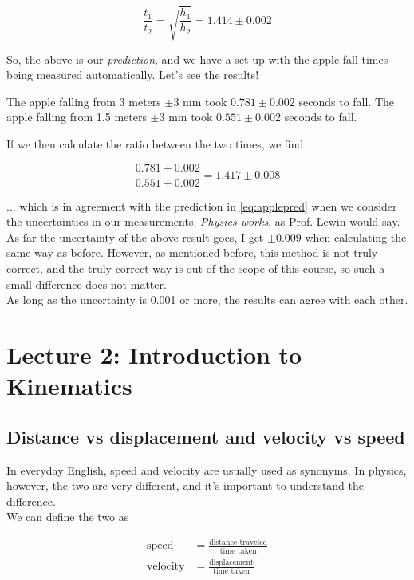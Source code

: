\documentclass[8.01x]{subfiles}
\begin{document}
\begin{equation}
 \frac{t_1}{t_2} = \sqrt{\frac{h_1}{h_2}} = 1.414 \pm 0.002 \label{eq:applepred}
\end{equation}

So, the above is our \emph{prediction}, and we have a set-up with the apple fall times being measured automatically. Let's see the results!

The apple falling from 3 meters $\pm 3$ mm took $0.781 \pm 0.002$ seconds to fall. The apple falling from 1.5 meters $\pm 3$ mm took $0.551 \pm 0.002$ seconds to fall.

If we then calculate the ratio between the two times, we find

\begin{equation}
\frac{0.781 \pm 0.002}{0.551 \pm 0.002} = 1.417 \pm 0.008
\end{equation}

... which is in agreement with the prediction in \eqref{eq:applepred} when we consider the uncertainties in our measurements. \emph{Physics works}, as Prof. Lewin would say.\\
As far the uncertainty of the above result goes, I get $\pm 0.009$ when calculating the same way as before. However, as mentioned before, this method is not truly correct, and the truly correct way is out of the scope of this course, so such a small difference does not matter.\\
As long as the uncertainty is 0.001 or more, the results can agree with each other.

\section{Lecture 2: Introduction to Kinematics}

\subsection{Distance vs displacement and velocity vs speed}

In everyday English, speed and velocity are usually used as synonyms. In physics, however, the two are very different, and it's important to understand the difference.\\
We can define the two as

\begin{align}
 \text{speed} &= \frac{\text{distance traveled}}{\text{time taken}}\\
 \text{velocity} &= \frac{\text{displacement}}{\text{time taken}}
\end{align}
\end{document}
